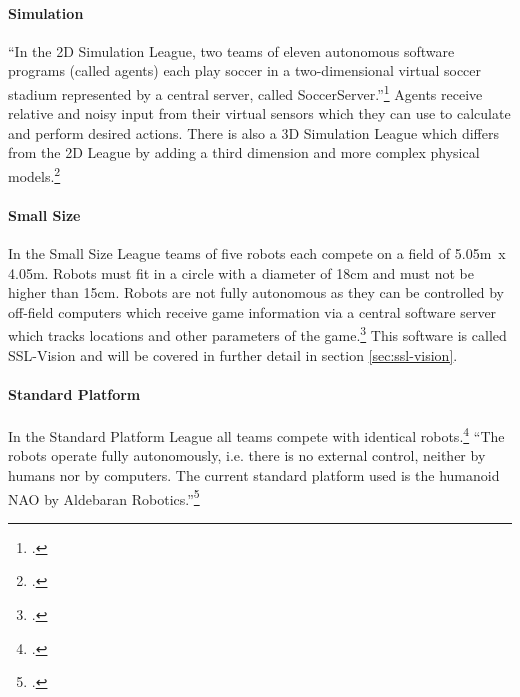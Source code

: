 \paragraph{Simulation}
``In the 2D Simulation League, two teams of eleven autonomous software programs
(called agents) each play soccer in a two-dimensional virtual soccer stadium
represented by a central server, called SoccerServer.''\footcite[][]{robo_simu_wiki}
Agents receive relative and noisy input from their virtual sensors which they can use to
calculate and perform desired actions. There is also a 3D Simulation League which differs
from the 2D League by adding a third dimension and more complex physical
models.\footcite[Cf.][]{robo_simu_wiki}
 
\paragraph{Small Size}
In the Small Size League teams of five robots each compete on a field of 5.05m~x 4.05m.
Robots must fit in a circle with a diameter of 18cm and must not be higher than 15cm.
Robots are not fully autonomous as they can be controlled by off-field computers which receive
game information via a central software server which tracks locations and other parameters
of the game.\footcite[Cf.][]{robo_ssl_wiki}
This software is called SSL-Vision and will be covered in further detail in section
\ref{sec:ssl-vision}.
 
\paragraph{Standard Platform}
In the Standard Platform League all teams compete with identical
robots.\footcite[Cf.][]{robo_std_wiki} ``The robots operate fully autonomously,
i.e. there is no external control, neither by humans nor by computers. The
current standard platform used is the humanoid NAO by Aldebaran
Robotics.''\footcite[][]{robo_std_wiki}


